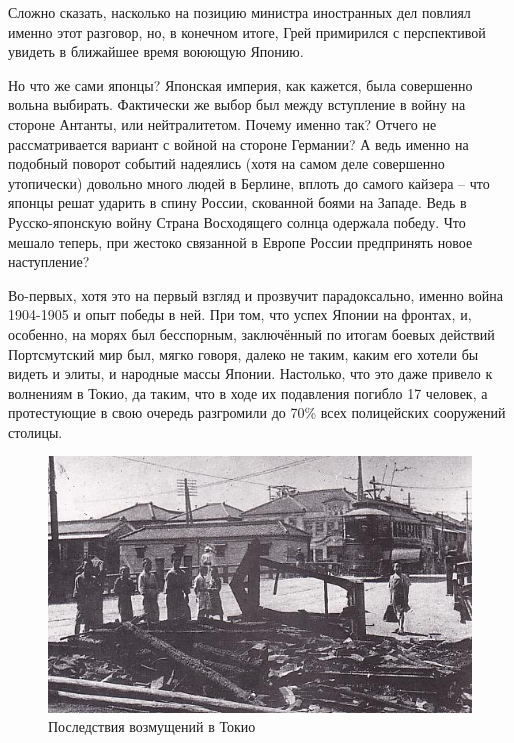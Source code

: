 Сложно сказать, насколько на позицию министра иностранных дел повлиял именно этот разговор, но, в конечном итоге, Грей примирился с перспективой увидеть в ближайшее время воюющую Японию.

Но что же сами японцы? Японская империя, как кажется, была совершенно вольна выбирать. Фактически же выбор был между вступление в войну на стороне Антанты, или нейтралитетом. Почему именно так? Отчего не рассматривается вариант с войной на стороне Германии? А ведь именно на подобный поворот событий надеялись (хотя на самом деле совершенно утопически) довольно много людей в Берлине, вплоть до самого кайзера – что японцы решат ударить в спину России, скованной боями на Западе. Ведь в Русско-японскую войну Страна Восходящего солнца одержала победу. Что мешало теперь, при жестоко связанной в Европе России предпринять новое наступление?

Во-первых, хотя это на первый взгляд и прозвучит парадоксально, именно война 1904-1905 и опыт победы в ней. При том, что успех Японии на фронтах, и, особенно, на морях был бесспорным, заключённый по итогам боевых действий Портсмутский мир был, мягко говоря, далеко не таким, каким его хотели бы видеть и элиты, и народные массы Японии. Настолько, что это даже привело к волнениям в Токио, да таким, что в ходе их подавления погибло 17 человек, а протестующие в свою очередь разгромили до 70\% всех полицейских сооружений столицы. 
\begin{figure}[h!tb] 
	\centering\includegraphics[scale=0.4]{Glava3/sZ8FMZJE-O0.jpg}
	\caption{Последствия возмущений в Токио}%
\end{figure}

